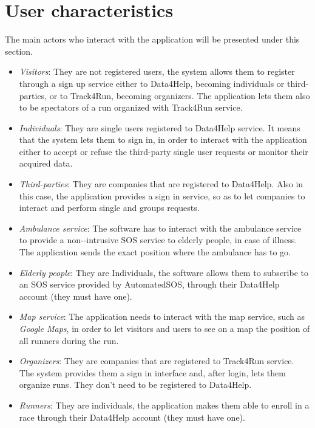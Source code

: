 \section{User characteristics}

The main actors who interact with the application will be presented under this section. 

\begin{itemize}
    \item \emph{Visitors}: They are not registered users, the system allows them to register through a sign up service either to Data4Help, becoming individuals or third-parties, or to Track4Run, becoming organizers. The application lets them also to be spectators of a run organized with Track4Run service. 
    \item \emph{Individuals}: They are single users registered to Data4Help service. It means that the system lets them to sign in, in order to interact with the application either to accept or refuse the third-party single user requests or monitor their acquired data.
    \item \emph{Third-parties}: They are companies that are registered to Data4Help. Also in this case, the application provides a sign in service, so as to let companies to interact and perform single and groups requests. 
    \item \emph{Ambulance service}: The software has to interact with the ambulance service  to provide a non-‐intrusive SOS service to elderly people, in case of illness. The application sends the exact position where the ambulance has to go.  
    \item \emph{Elderly people}: They are Individuals, the software allows them to subscribe to an SOS service provided by AutomatedSOS, through their Data4Help account (they must have one). 
    \item \emph{Map service}: The application needs to interact with the map service, such as \emph{Google Maps}, in order to let visitors and users to see on a map the position of all runners during the run.
    \item \emph{Organizers}: They are companies that are registered to Track4Run service. The system provides them a sign in interface and, after login, lets them organize runs. They don't need to be registered to Data4Help.
    \item \emph{Runners}: They are individuals, the application makes them able to enroll in a race through their Data4Help account (they must have one).
\end{itemize}
